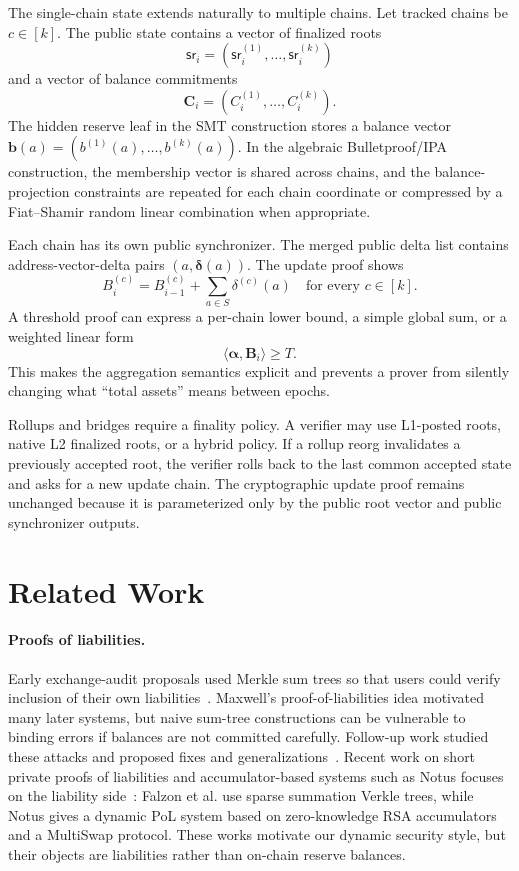 \documentclass[runningheads]{llncs}
\newcommand{\sr}{\mathsf{sr}}
\newcommand{\inner}[2]{\langle #1,#2\rangle}
\begin{document}
The single-chain state extends naturally to multiple chains.  Let tracked chains be \(c\in[k]\).  The public state contains a vector of finalized roots
\[
        \boldsymbol{\sr}_i=(\sr_i^{(1)},\ldots,\sr_i^{(k)})
\]
and a vector of balance commitments
\[
        \mathbf C_i=(C_i^{(1)},\ldots,C_i^{(k)}).
\]
The hidden reserve leaf in the SMT construction stores a balance vector \(\mathbf b(a)=(b^{(1)}(a),\ldots,b^{(k)}(a))\).  In the algebraic Bulletproof/IPA construction, the membership vector is shared across chains, and the balance-projection constraints are repeated for each chain coordinate or compressed by a Fiat--Shamir random linear combination when appropriate.

Each chain has its own public synchronizer.  The merged public delta list contains address-vector-delta pairs \((a,\boldsymbol\delta(a))\).  The update proof shows
\[
        B_i^{(c)}=B_{i-1}^{(c)}+\sum_{a\in S}\delta^{(c)}(a)
        \quad\text{for every }c\in[k].
\]
A threshold proof can express a per-chain lower bound, a simple global sum, or a weighted linear form
\[
        \inner{\boldsymbol\alpha}{\mathbf B_i}\ge T.
\]
This makes the aggregation semantics explicit and prevents a prover from silently changing what ``total assets'' means between epochs.

Rollups and bridges require a finality policy.  A verifier may use L1-posted roots, native L2 finalized roots, or a hybrid policy.  If a rollup reorg invalidates a previously accepted root, the verifier rolls back to the last common accepted state and asks for a new update chain.  The cryptographic update proof remains unchanged because it is parameterized only by the public root vector and public synchronizer outputs.

\section{Related Work}

\paragraph{Proofs of liabilities.}
Early exchange-audit proposals used Merkle sum trees so that users could verify inclusion of their own liabilities~\cite{Maxwell14}.  Maxwell's proof-of-liabilities idea motivated many later systems, but naive sum-tree constructions can be vulnerable to binding errors if balances are not committed carefully.  Follow-up work studied these attacks and proposed fixes and generalizations~\cite{Hu18,Ji21}.  Recent work on short private proofs of liabilities and accumulator-based systems such as Notus focuses on the liability side~\cite{Falzon23,Notus24}: Falzon et al. use sparse summation Verkle trees, while Notus gives a dynamic PoL system based on zero-knowledge RSA accumulators and a MultiSwap protocol.  These works motivate our dynamic security style, but their objects are liabilities rather than on-chain reserve balances.
\end{document}
